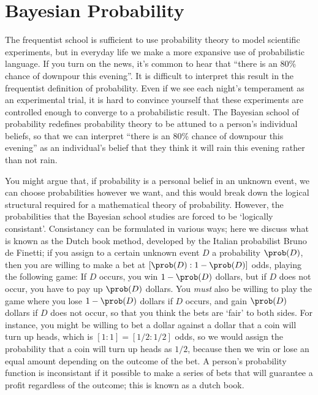 \section{Bayesian Probability}

The frequentist school is sufficient to use probability theory to model scientific experiments, but in everyday life we make a more expansive use of probabilistic language. If you turn on the news, it's common to hear that ``there is an 80\% chance of downpour this evening''. It is difficult to interpret this result in the frequentist definition of probability. Even if we see each night's temperament as an experimental trial, it is hard to convince yourself that these experiments are controlled enough to converge to a probabilistic result. The Bayesian school of probability redefines probability theory to be attuned to a person's individual beliefs, so that we can interpret ``there is an 80\% chance of downpour this evening'' as an individual's belief that they think it will rain this evening rather than not rain.

You might argue that, if probability is a personal belief in an unknown event, we can choose probabilities however we want, and this would break down the logical structural required for a mathematical theory of probability. However, the probabilities that the Bayesian school studies are forced to be `logically consistant'. Consistancy can be formulated in various ways; here we discuss what is known as the Dutch book method, developed by the Italian probabilist Bruno de Finetti; if you assign to a certain unknown event $D$ a probability $\prob(D)$, then you are willing to make a bet at $[\prob(D):1 - \prob(D)]$ odds, playing the following game: If $D$ occurs, you win $1 - \prob(D)$ dollars, but if $D$ does not occur, you have to pay up $\prob(D)$ dollars. You {\it must} also be willing to play the game where you lose $1 - \prob(D)$ dollars if $D$ occurs, and gain $\prob(D)$ dollars if $D$ does not occur, so that you think the bets are `fair' to both sides. For instance, you might be willing to bet a dollar against a dollar that a coin will turn up heads, which is $[1:1] = [1/2:1/2]$ odds, so we would assign the probability that a coin will turn up heads as $1/2$, because then we win or lose an equal amount depending on the outcome of the bet. A person's probability function is inconsistant if it possible to make a series of bets that will guarantee a profit regardless of the outcome; this is known as a dutch book.

